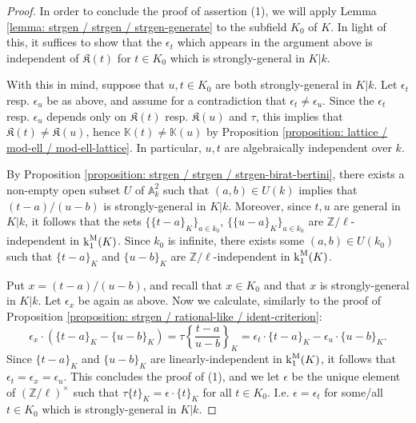 \documentclass[11pt]{amsart}
\theoremstyle{definition}
\theoremstyle{remark}
\numberwithin{equation}{section}
\newcommand{\Z}{\mathbb{Z}}
\newcommand{\Abb}{\mathbb{A}}
\newcommand{\Kbb}{\mathbb{K}}
\newcommand{\Kfrak}{\mathfrak{K}}
\renewcommand{\k}{\operatorname{k}^{\rm M}}
\begin{document}
\begin{proof}
  In order to conclude the proof of assertion (1), we will apply Lemma \ref{lemma: strgen / strgen / strgen-generate} to the subfield $K_0$ of $K$.
  In light of this, it suffices to show that the $\epsilon_t$ which appears in the argument above is independent of $\Kfrak(t)$ for $t \in K_0$ which is strongly-general in $K|k$.

  With this in mind, suppose that $u,t \in K_0$ are both strongly-general in $K|k$.
  Let $\epsilon_t$ resp. $\epsilon_u$ be as above, and assume for a contradiction that $\epsilon_t \neq \epsilon_u$.
  Since the $\epsilon_t$ resp. $\epsilon_u$ depends only on $\Kfrak(t)$ resp. $\Kfrak(u)$ and $\tau$, this implies that $\Kfrak(t) \neq \Kfrak(u)$, hence $\Kbb(t) \neq \Kbb(u)$ by Proposition \ref{proposition: lattice / mod-ell / mod-ell-lattice}.
  In particular, $u,t$ are algebraically independent over $k$.

  By Proposition \ref{proposition: strgen / strgen / strgen-birat-bertini}, there exists a non-empty open subset $U$ of $\Abb^2_k$ such that $(a,b) \in U(k)$ implies that $(t-a)/(u-b)$ is strongly-general in $K|k$.
  Moreover, since $t,u$ are general in $K|k$, it follows that the sets $\{\{t-a\}_K\}_{a \in k_0}$, $\{\{u-a\}_K\}_{a \in k_0}$ are $\Z/\ell$-independent in $\k_1(K)$.
  Since $k_0$ is infinite, there exists some $(a,b) \in U(k_0)$ such that $\{t-a\}_K$ and $\{u-b\}_K$ are $\Z/\ell$-independent in $\k_1(K)$.

  Put $x = (t-a)/(u-b)$, and recall that $x \in K_0$ and that $x$ is strongly-general in $K|k$.
  Let $\epsilon_x$ be again as above.
  Now we calculate, similarly to the proof of Proposition \ref{proposition: strgen / rational-like / ident-criterion}:
  \[\epsilon_x \cdot (\{t-a\}_K - \{u-b\}_K) = \tau\left\{\frac{t-a}{u-b}\right\}_K = \epsilon_t \cdot \{t-a\}_K-\epsilon_u \cdot \{u-b\}_K.\]
  Since $\{t-a\}_K$ and $\{u-b\}_K$ are linearly-independent in $\k_1(K)$, it follows that $\epsilon_t = \epsilon_x = \epsilon_u$.
  This concludes the proof of (1), and we let $\epsilon$ be the unique element of $(\Z/\ell)^\times$ such that $\tau\{t\}_K = \epsilon \cdot \{t\}_K$ for all $t \in K_0$.
  I.e. $\epsilon = \epsilon_t$ for some/all $t \in K_0$ which is strongly-general in $K|k$.


\end{proof}
\end{document}
